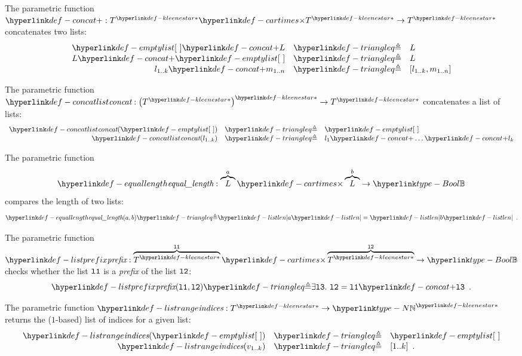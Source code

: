 \hypertarget{def-concat}{}
\begin{definition}
The parametric function $\concat : \KleeneStar{T} \cartimes \KleeneStar{T} \rightarrow \KleeneStar{T}$ concatenates two lists:
\[
    \begin{array}{rcl}
    \emptylist \concat L &\triangleq& L\\
    L \concat \emptylist &\triangleq& L\\
    l_{1..k} \concat m_{1..n} &\triangleq& [l_{1..k}, m_{1..n}]
    \end{array}
\]
\end{definition}

\hypertarget{def-concatlist}{}
\begin{definition}
The parametric function\\
$\concatlist : \KleeneStar{\left(\KleeneStar{T}\right)} \rightarrow \KleeneStar{T}$ concatenates a list of lists:
\[
  \begin{array}{rcl}
    \concatlist(\emptylist) &\triangleq& \emptylist\\
    \concatlist(l_{1..k}) &\triangleq& l_1 \concat \ldots \concat l_k \\
  \end{array}
\]
\end{definition}

\hypertarget{def-equallength}{}
\begin{definition}
The parametric function
\[
  \equallength : \overname{L}{a} \cartimes \overname{L}{b} \rightarrow \Bool
\]
compares the length of two lists:
\[
\equallength(a, b) \triangleq \listlen{a}=\listlen{b} \enspace.
\]
\end{definition}

\hypertarget{def-listprefix}{}
\begin{definition}
The parametric function $\listprefix : \overname{\KleeneStar{T}}{\vlone} \cartimes \overname{\KleeneStar{T}}{\vltwo} \rightarrow \Bool$ checks whether
the list $\texttt{l1}$ is a \emph{prefix} of the list $\texttt{l2}$:
\[
\listprefix(\vlone, \vltwo) \triangleq \exists \vlthree.\ \vltwo = \vlone \concat \vlthree \enspace.
\]
\end{definition}

\hypertarget{def-listrange}{}
\begin{definition}
The parametric function $\listrange : \KleeneStar{T} \rightarrow \KleeneStar{\N}$ returns the ($1$-based) list of indices for a given list:
\[
    \begin{array}{rcl}
        \listrange(\emptylist) &\triangleq& \emptylist\\
        \listrange(v_{1..k}) &\triangleq& [1..k] \enspace.
    \end{array}
\]
\end{definition}

